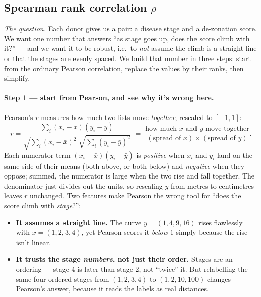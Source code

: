 \documentclass[11pt]{article}
\begin{document}
\subsection{Spearman rank correlation $\rho$}

\textit{The question.} Each donor gives us a pair: a disease stage and a de-zonation score. We want one number that answers ``as stage goes up, does the score climb with it?'' --- and we want it to be robust, i.e.\ to \emph{not} assume the climb is a straight line or that the stages are evenly spaced. We build that number in three steps: start from the ordinary Pearson correlation, replace the values by their ranks, then simplify.

\paragraph{Step 1 --- start from Pearson, and see why it's wrong here.} Pearson's $r$ measures how much two lists move \emph{together}, rescaled to $[-1,1]$:
\[
r = \frac{\sum_i (x_i-\bar x)(y_i-\bar y)}{\sqrt{\sum_i (x_i-\bar x)^2}\;\sqrt{\sum_i (y_i-\bar y)^2}}
\;=\; \frac{\text{how much } x \text{ and } y \text{ move together}}{(\text{spread of }x)\times(\text{spread of }y)}.
\]
Each numerator term $(x_i-\bar x)(y_i-\bar y)$ is \emph{positive} when $x_i$ and $y_i$ land on the same side of their means (both above, or both below) and \emph{negative} when they oppose; summed, the numerator is large when the two rise and fall together. The denominator just divides out the units, so rescaling $y$ from metres to centimetres leaves $r$ unchanged. Two features make Pearson the wrong tool for ``does the score climb with \emph{stage}?'':
\begin{itemize}[leftmargin=*,topsep=2pt]
  \item \textbf{It assumes a straight line.} The curve $y=(1,4,9,16)$ rises flawlessly with $x=(1,2,3,4)$, yet Pearson scores it \emph{below} $1$ simply because the rise isn't linear.
  \item \textbf{It trusts the stage \emph{numbers}, not just their order.} Stages are an ordering --- stage 4 is later than stage 2, not ``twice'' it. But relabelling the same four ordered stages from $(1,2,3,4)$ to $(1,2,10,100)$ changes Pearson's answer, because it reads the labels as real distances.
\end{itemize}
\end{document}
